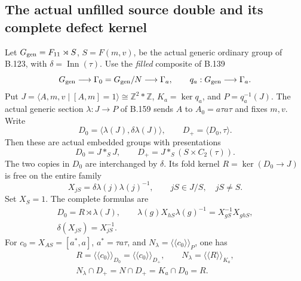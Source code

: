 \subsection*{The actual unfilled source double and its complete defect kernel}
\label{stmt:B161}
Let $G_{\rm gen}=F_{11}\rtimes S$, $S=F(m,v)$, be the actual
generic ordinary group of B.123, with $\delta=\operatorname{Inn}(\tau)$.
Use the \emph{filled} composite of B.139
\[
 G_{\rm gen}\longrightarrow\Gamma_0=G_{\rm gen}/N
       \longrightarrow\Gamma_a,
 \qquad q_a:G_{\rm gen}\longrightarrow\Gamma_a.
\]
Put $J=\langle A,m,v\mid[A,m]=1\rangle\cong\mathbb Z^2*\mathbb Z$,
$K_a=\ker q_a$, and $P=q_a^{-1}(J)$. The actual generic section
$\lambda:J\to P$ of B.159 sends $A$ to $A_0=a\tau a\tau$ and fixes
$m,v$. Write
\[
 D_0=\langle\lambda(J),\delta\lambda(J)\rangle,\qquad
 D_+=\langle D_0,\tau\rangle.
\]
Then these are actual embedded groups with presentations
\begin{equation}\label{eq:B161-double}
 D_0=J*_{S}J,\qquad
 D_+=J*_{S}(S\times C_2(\tau)).
\end{equation}
The two copies in $D_0$ are interchanged by $\delta$. Its fold kernel
$R=\ker(D_0\to J)$ is free on the entire family
\begin{equation}\label{eq:B161-basis}
 X_{jS}=\delta\lambda(j)\lambda(j)^{-1},
 \qquad jS\in J/S,\quad jS\ne S.
\end{equation}
Set $X_S=1$. The complete formulas are
\begin{equation}\label{eq:B161-action}
 \begin{gathered}
 D_0=R\rtimes\lambda(J),\qquad
 \lambda(g)X_{hS}\lambda(g)^{-1}=X_{gS}^{-1}X_{ghS},\\
 \delta(X_{jS})=X_{jS}^{-1}.
 \end{gathered}
\end{equation}
For $c_0=X_{AS}=[a^*,a]$, $a^*=\tau a\tau$, and
$N_\lambda=\langle\!\langle c_0\rangle\!\rangle_P$, one has
\begin{equation}\label{eq:B161-kernels}
 \begin{gathered}
 R=\langle\!\langle c_0\rangle\!\rangle_{D_0}
   =\langle\!\langle c_0\rangle\!\rangle_{D_+},\qquad
 N_\lambda=\langle\!\langle R\rangle\!\rangle_{K_a},\\
 N_\lambda\cap D_+=N\cap D_+=K_a\cap D_0=R.
 \end{gathered}
\end{equation}
